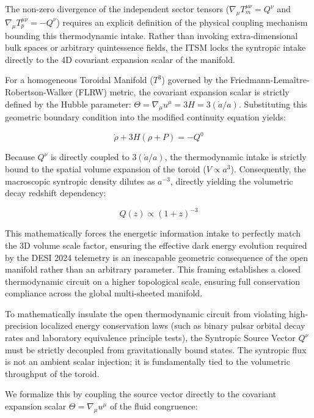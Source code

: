 \documentclass[aps,prd,10pt,twocolumn,superscriptaddress,nofootinbib]{revtex4-2}
\begin{document}
The non-zero divergence of the independent sector tensors ($\nabla_{\mu}T_{m}^{\mu\nu} = Q^{\nu}$ and $\nabla_{\mu}T_{p}^{\mu\nu} = -Q^{\nu}$) requires an explicit definition of the physical coupling mechanism bounding this thermodynamic intake. Rather than invoking extra-dimensional bulk spaces or arbitrary quintessence fields, the ITSM locks the syntropic intake directly to the 4D covariant expansion scalar of the manifold. 

For a homogeneous Toroidal Manifold ($T^3$) governed by the Friedmann-Lemaître-Robertson-Walker (FLRW) metric, the covariant expansion scalar is strictly defined by the Hubble parameter: $\Theta = \nabla_\mu u^\mu = 3H = 3(\dot{a}/a)$. Substituting this geometric boundary condition into the modified continuity equation yields:

\begin{equation}
\dot{\rho} + 3H(\rho + P) = -Q^0
\end{equation}

Because $Q^\nu$ is directly coupled to $3(\dot{a}/a)$, the thermodynamic intake is strictly bound to the spatial volume expansion of the toroid ($V \propto a^3$). Consequently, the macroscopic syntropic density dilutes as $a^{-3}$, directly yielding the volumetric decay redshift dependency:

\begin{equation} \label{eq:syntropic_decay}
Q(z) \propto (1+z)^{-3}
\end{equation}

This mathematically forces the energetic information intake to perfectly match the 3D volume scale factor, ensuring the effective dark energy evolution required by the DESI 2024 telemetry is an inescapable geometric consequence of the open manifold rather than an arbitrary parameter. This framing establishes a closed thermodynamic circuit on a higher topological scale, ensuring full conservation compliance across the global multi-sheeted manifold.

To mathematically insulate the open thermodynamic circuit from violating high-precision localized energy conservation laws (such as binary pulsar orbital decay rates and laboratory equivalence principle tests), the Syntropic Source Vector $Q^\nu$ must be strictly decoupled from gravitationally bound states. The syntropic flux is not an ambient scalar injection; it is fundamentally tied to the volumetric throughput of the toroid. 

We formalize this by coupling the source vector directly to the covariant expansion scalar $\Theta = \nabla_\mu u^\mu$ of the fluid congruence:
\end{document}
